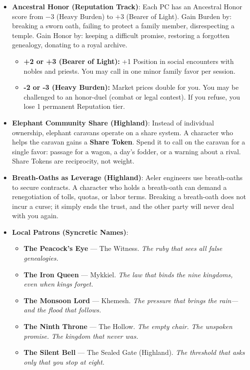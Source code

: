 \begin{itemize}
\item \textbf{Ancestral Honor (Reputation Track)}: Each PC has an Ancestral Honor score from \(-3\) (Heavy Burden) to \(+3\) (Bearer of Light). Gain Burden by: breaking a sworn oath, failing to protect a family member, disrespecting a temple. Gain Honor by: keeping a difficult promise, restoring a forgotten genealogy, donating to a royal archive.
  \begin{itemize}
    \item \textbf{+2 or +3 (Bearer of Light):} +1 Position in social encounters with nobles and priests. You may call in one minor family favor per session.
    \item \textbf{-2 or -3 (Heavy Burden):} Market prices double for you. You may be challenged to an honor-duel (combat or legal contest). If you refuse, you lose 1 permanent Reputation tier.
  \end{itemize}

\item \textbf{Elephant Community Share (Highland)}: Instead of individual ownership, elephant caravans operate on a share system. A character who helps the caravan gains a \textbf{Share Token}. Spend it to call on the caravan for a single favor: passage for a wagon, a day's fodder, or a warning about a rival. Share Tokens are reciprocity, not weight.

\item \textbf{Breath-Oaths as Leverage (Highland)}: Aeler engineers use breath-oaths to secure contracts. A character who holds a breath-oath can demand a renegotiation of tolls, quotas, or labor terms. Breaking a breath-oath does not incur a curse; it simply ends the trust, and the other party will never deal with you again.

\item \textbf{Local Patrons (Syncretic Names)}:
  \begin{itemize}
    \item \textbf{The Peacock's Eye} --- The Witness. \textit{The ruby that sees all false genealogies.}
    \item \textbf{The Iron Queen} --- Mykkiel. \textit{The law that binds the nine kingdoms, even when kings forget.}
    \item \textbf{The Monsoon Lord} --- Khemesh. \textit{The pressure that brings the rain---and the flood that follows.}
    \item \textbf{The Ninth Throne} --- The Hollow. \textit{The empty chair. The unspoken promise. The kingdom that never was.}
    \item \textbf{The Silent Bell} --- The Sealed Gate (Highland). \textit{The threshold that asks only that you stop at eight.}
  \end{itemize}
\end{itemize}

